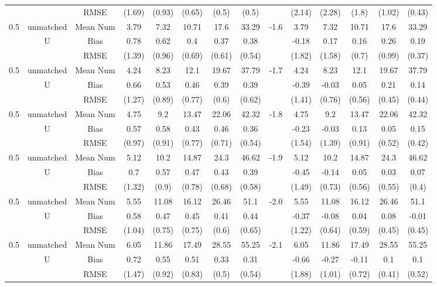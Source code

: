 \begin{tabular}{@{\extracolsep{5pt}}lc|cccccc|lccccc}
 &  & RMSE & (1.69) & (0.93) & (0.65) & (0.5) & (0.5) &  & (2.14) & (2.28) & (1.8) & (1.02) & (0.43) \\
0.5 & unmatched & Mean Num & 3.79 & 7.32 & 10.71 & 17.6 & 33.29 & -1.6 & 3.79 & 7.32 & 10.71 & 17.6 & 33.29 \\
 & U & Bias & 0.78 & 0.62 & 0.4 & 0.37 & 0.38 &  & -0.18 & 0.17 & 0.16 & 0.26 & 0.19 \\
 &  & RMSE & (1.39) & (0.96) & (0.69) & (0.61) & (0.54) &  & (1.82) & (1.58) & (0.7) & (0.99) & (0.37) \\
0.5 & unmatched & Mean Num & 4.24 & 8.23 & 12.1 & 19.67 & 37.79 & -1.7 & 4.24 & 8.23 & 12.1 & 19.67 & 37.79 \\
 & U & Bias & 0.66 & 0.53 & 0.46 & 0.39 & 0.39 &  & -0.39 & -0.03 & 0.05 & 0.21 & 0.14 \\
 &  & RMSE & (1.27) & (0.89) & (0.77) & (0.6) & (0.62) &  & (1.41) & (0.76) & (0.56) & (0.45) & (0.44) \\
0.5 & unmatched & Mean Num & 4.75 & 9.2 & 13.47 & 22.06 & 42.32 & -1.8 & 4.75 & 9.2 & 13.47 & 22.06 & 42.32 \\
 & U & Bias & 0.57 & 0.58 & 0.43 & 0.46 & 0.36 &  & -0.23 & -0.03 & 0.13 & 0.05 & 0.15 \\
 &  & RMSE & (0.97) & (0.91) & (0.77) & (0.71) & (0.54) &  & (1.54) & (1.39) & (0.91) & (0.52) & (0.42) \\
0.5 & unmatched & Mean Num & 5.12 & 10.2 & 14.87 & 24.3 & 46.62 & -1.9 & 5.12 & 10.2 & 14.87 & 24.3 & 46.62 \\
 & U & Bias & 0.7 & 0.57 & 0.47 & 0.43 & 0.39 &  & -0.45 & -0.14 & 0.05 & 0.03 & 0.07 \\
 &  & RMSE & (1.32) & (0.9) & (0.78) & (0.68) & (0.58) &  & (1.49) & (0.73) & (0.56) & (0.55) & (0.4) \\
0.5 & unmatched & Mean Num & 5.55 & 11.08 & 16.12 & 26.46 & 51.1 & -2.0 & 5.55 & 11.08 & 16.12 & 26.46 & 51.1 \\
 & U & Bias & 0.58 & 0.47 & 0.45 & 0.41 & 0.44 &  & -0.37 & -0.08 & 0.04 & 0.08 & -0.01 \\
 &  & RMSE & (1.04) & (0.75) & (0.75) & (0.6) & (0.65) &  & (1.22) & (0.64) & (0.59) & (0.45) & (0.45) \\
0.5 & unmatched & Mean Num & 6.05 & 11.86 & 17.49 & 28.55 & 55.25 & -2.1 & 6.05 & 11.86 & 17.49 & 28.55 & 55.25 \\
 & U & Bias & 0.72 & 0.55 & 0.51 & 0.33 & 0.31 &  & -0.66 & -0.27 & -0.11 & 0.1 & 0.1 \\
 &  & RMSE & (1.47) & (0.92) & (0.83) & (0.5) & (0.54) &  & (1.88) & (1.01) & (0.72) & (0.41) & (0.52) \\

\end{tabular}
